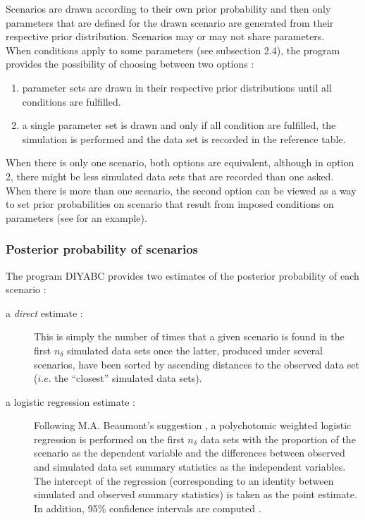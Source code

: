 Scenarios are drawn according to their own prior probability and then only parameters that are defined for the drawn scenario are generated from their respective prior distribution. Scenarios may or may not share parameters.\\
When conditions apply to some parameters (see subsection 2.4), the program provides the possibility of choosing between two options :
\begin{enumerate}
\item parameter sets are drawn in their respective prior distributions until all conditions are fulfilled.
\item a single parameter set is drawn and only if all condition are fulfilled, the simulation is performed and the data set is recorded in the reference table.
\end{enumerate}
When there is only one scenario, both options are equivalent, although in option 2, there might be less simulated data sets that are recorded than one asked. When there is more than one scenario, the second option can be viewed as a way to set prior probabilities on scenario that result from imposed conditions on parameters (see \citet{ME2005} for an example).  

\subsubsection{Posterior probability of scenarios}
The program DIYABC provides two estimates of the posterior probability of each scenario :
\begin{description} 
\item[a \emph{direct}  estimate :] This is simply the number of times that a given scenario is found in the first $n_{\delta}$ simulated data sets once the latter, produced under several scenarios, have been sorted by ascending distances to the observed data set ($i.e.$ the ``closest'' simulated data sets).\\
\item[a logistic regression estimate :] Following M.A. Beaumont's suggestion \citep{FR2007,B2008}, a polychotomic weighted logistic regression is performed on the first  $n_{\delta}$ data sets with the proportion of the scenario as the dependent variable and the differences between observed and simulated data set summary statistics as the independent variables. The intercept of the regression (corresponding to an identity between simulated and observed summary statistics) is taken as the point estimate. In addition, 95\% confidence intervals are computed \citep{C2008}. 
\end{description} 

